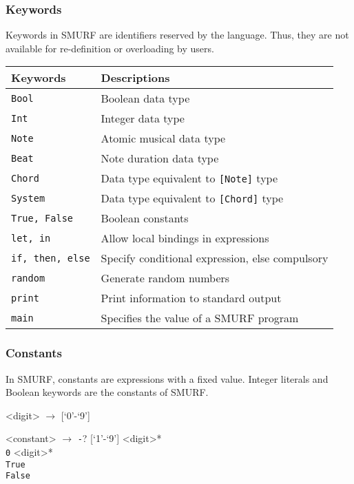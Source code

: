\subsubsection{Keywords}
\label{sec:keywords}
Keywords in SMURF are identifiers reserved by the language. Thus, they are not available for
re-definition or overloading by users. 

\begin{table} [H]
	\centering
    \begin{tabular}{ll}
    \hline\hline
    Keywords & Descriptions \\ 
    \hline\hline
      \texttt{Bool} & Boolean data type \\ \hline
      \texttt{Int} & Integer data type \\ \hline
      \texttt{Note} & Atomic musical data type \\ \hline
      \texttt{Beat} & Note duration data type\\ \hline
      \texttt{Chord} & Data type equivalent to \texttt{[Note]} type \\ \hline
      \texttt{System} & Data type equivalent to \texttt{[Chord]} type \\ \hline
      \texttt{True, False} & Boolean constants \\ \hline
      \texttt{let, in} & Allow local bindings in expressions  \\ \hline
      \texttt{if, then, else} & Specify conditional expression, else compulsory  \\ \hline
      \texttt{random} & Generate random numbers \\ \hline
      \texttt{print} & Print information to standard output \\ \hline
      \texttt{main} & Specifies the value of a SMURF program\\ \hline
    \end{tabular}
\end{table}


\subsubsection{Constants}
\label{sec:constants}
In SMURF, constants are expressions with a fixed value. Integer literals and
Boolean keywords are the constants of SMURF. 

\setlength{\grammarindent}{6em}
\begin{grammar}
<digit> $\rightarrow$ [`0'-`9'] 

<constant> $\rightarrow$ \texttt{-}? [`1'-`9'] <digit>* \\
												 \texttt{0} <digit>* \\
												\texttt{True} \\
												\texttt{False}
\end{grammar}


